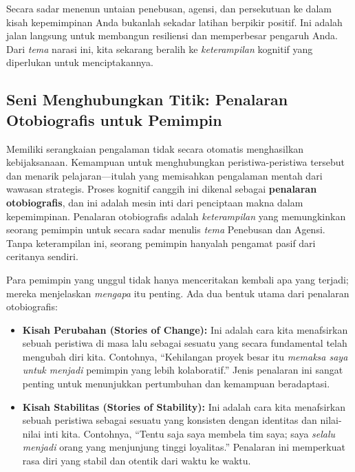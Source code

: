 \documentclass[
  letterpaper,
  DIV=11,
  numbers=noendperiod]{scrreprt}
\begin{document}
Secara sadar menenun untaian penebusan, agensi, dan persekutuan ke dalam
kisah kepemimpinan Anda bukanlah sekadar latihan berpikir positif. Ini
adalah jalan langsung untuk membangun resiliensi dan memperbesar
pengaruh Anda. Dari \emph{tema} narasi ini, kita sekarang beralih ke
\emph{keterampilan} kognitif yang diperlukan untuk menciptakannya.

\subsection{Seni Menghubungkan Titik: Penalaran Otobiografis untuk
Pemimpin}\label{seni-menghubungkan-titik-penalaran-otobiografis-untuk-pemimpin}

Memiliki serangkaian pengalaman tidak secara otomatis menghasilkan
kebijaksanaan. Kemampuan untuk menghubungkan peristiwa-peristiwa
tersebut dan menarik pelajaran---itulah yang memisahkan pengalaman
mentah dari wawasan strategis. Proses kognitif canggih ini dikenal
sebagai \textbf{penalaran otobiografis}, dan ini adalah mesin inti dari
penciptaan makna dalam kepemimpinan. Penalaran otobiografis adalah
\emph{keterampilan} yang memungkinkan seorang pemimpin untuk secara
sadar menulis \emph{tema} Penebusan dan Agensi. Tanpa keterampilan ini,
seorang pemimpin hanyalah pengamat pasif dari ceritanya sendiri.

Para pemimpin yang unggul tidak hanya menceritakan kembali apa yang
terjadi; mereka menjelaskan \emph{mengapa} itu penting. Ada dua bentuk
utama dari penalaran otobiografis:

\begin{itemize}
\item
  \textbf{Kisah Perubahan (Stories of Change):} Ini adalah cara kita
  menafsirkan sebuah peristiwa di masa lalu sebagai sesuatu yang secara
  fundamental telah mengubah diri kita. Contohnya, ``Kehilangan proyek
  besar itu \emph{memaksa saya untuk menjadi} pemimpin yang lebih
  kolaboratif.'' Jenis penalaran ini sangat penting untuk menunjukkan
  pertumbuhan dan kemampuan beradaptasi.
\item
  \textbf{Kisah Stabilitas (Stories of Stability):} Ini adalah cara kita
  menafsirkan sebuah peristiwa sebagai sesuatu yang konsisten dengan
  identitas dan nilai-nilai inti kita. Contohnya, ``Tentu saja saya
  membela tim saya; saya \emph{selalu menjadi} orang yang menjunjung
  tinggi loyalitas.'' Penalaran ini memperkuat rasa diri yang stabil dan
  otentik dari waktu ke waktu.
\end{itemize}
\end{document}

